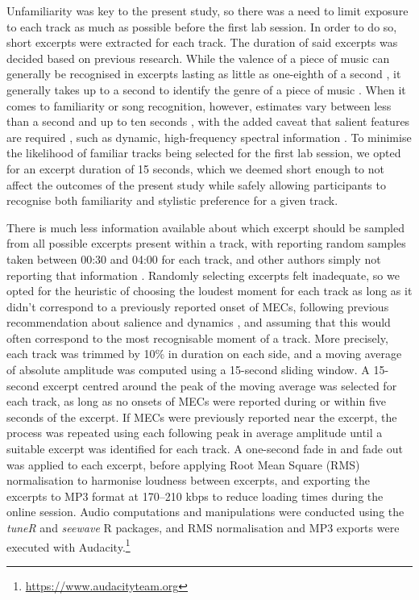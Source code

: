 Unfamiliarity was key to the present study, so there was a need to limit exposure to each track as much as possible before the first lab session. In order to do so, short excerpts were extracted for each track. The duration of said excerpts was decided based on previous research. While the valence of a piece of music can generally be recognised in excerpts lasting as little as one-eighth of a second \parencite[for a review, see][]{mace2012}, it generally takes up to a second to identify the genre of a piece of music \parencite{gjerdingen2008,mace2012}. When it comes to familiarity or song recognition, however, estimates vary between less than a second and up to ten seconds \parencite{jensenius2002,krumhansl2010,pereira2011,schellenberg1999}, with the added caveat that salient features are required \parencite{jensenius2002}, such as dynamic, high-frequency spectral information \parencite{schellenberg1999}. To minimise the likelihood of familiar tracks being selected for the first lab session, we opted for an excerpt duration of 15 seconds, which we deemed short enough to not affect the outcomes of the present study while safely allowing participants to recognise both familiarity and stylistic preference for a given track.

There is much less information available about which excerpt should be sampled from all possible excerpts present within a track, with \textcite{mace2012} reporting random samples taken between 00:30 and 04:00 for each track, and other authors simply not reporting that information \parencite[e.g.,][]{bonnevilleroussy2017,krumhansl2010,pereira2011}. Randomly selecting excerpts felt inadequate, so we opted for the heuristic of choosing the loudest moment for each track as long as it didn't correspond to a previously reported onset of MECs, following previous recommendation about salience and dynamics \parencite{jensenius2002,schellenberg1999}, and assuming that this would often correspond to the most recognisable moment of a track. More precisely, each track was trimmed by 10\% in duration on each side, and a moving average of absolute amplitude was computed using a 15-second sliding window. A 15-second excerpt centred around the peak of the moving average was selected for each track, as long as no onsets of MECs were reported during or within five seconds of the excerpt. If MECs were previously reported near the excerpt, the process was repeated using each following peak in average amplitude until a suitable excerpt was identified for each track. A one-second fade in and fade out was applied to each excerpt, before applying Root Mean Square (RMS) normalisation to harmonise loudness between excerpts, and exporting the excerpts to MP3 format at 170--210 kbps to reduce loading times during the online session. Audio computations and manipulations were conducted using the \emph{tuneR} \parencite{ligges2018} and \emph{seewave} \parencite{sueur2008} R packages, and RMS normalisation and MP3 exports were executed with Audacity.\footnote{\url{https://www.audacityteam.org}}

